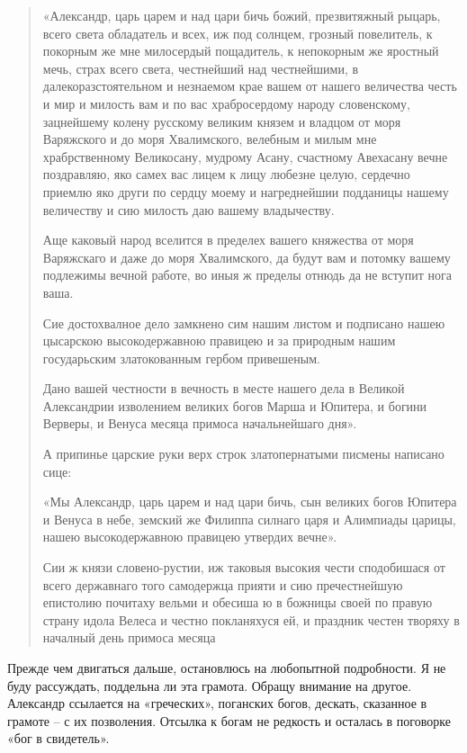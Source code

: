\begin{quotation}
«Александр, царь царем и над цари бичь божий, презвитяжный рыцарь, всего света обладатель и всех, иж под солнцем, грозный повелитель, к покорным же мне милосердый пощадитель, к непокорным же яростный мечь, страх всего света, честнейший над честнейшими, в далекоразстоятельном и незнаемом крае вашем от нашего величества честь и мир и милость вам и по вас храбросердому народу словенскому, зацнейшему колену русскому великим князем и владцом от моря Варяжского и до моря Хвалимского, велебным и милым мне храбрственному Великосану, мудрому Асану, счастному Авехасану вечне поздравляю, яко самех вас лицем к лицу любезне целую, сердечно приемлю яко други по сердцу моему и нагреднейшии подданицы нашему величеству и сию милость даю вашему владычеству. 

Аще каковый народ вселится в пределех вашего княжества от моря Варяжскаго и даже до моря Хвалимского, да будут вам и потомку вашему подлежимы вечной работе, во иныя ж пределы отнюдь да не вступит нога ваша.

Сие достохвалное дело замкнено сим нашим листом и подписано нашею цысарскою высокодержавною правицею и за природным нашим государьским златокованным гербом привешеным.

Дано вашей честности в вечность в месте нашего дела в Великой Александрии изволением великих богов Марша и Юпитера, и богини Верверы, и Венуса месяца примоса начальнейшаго дня». 

А припинье царские руки верх строк златопернатыми писмены написано сице: 

«Мы Александр, царь царем и над цари бичь, сын великих богов Юпитера и Венуса в небе, земский же Филиппа силнаго царя и Алимпиады царицы, нашею высокодержавною правицею утвердих вечне». 

Сии ж князи словено-рустии, иж таковыя высокия чести сподобишася от всего державнаго того самодержца прияти и сию пречестнейшую епистолию почитаху вельми и обесиша ю в божницы своей по правую страну идола Велеса и честно покланяхуся ей, и праздник честен творяху в началный день примоса месяца
\end{quotation}

Прежде чем двигаться дальше, остановлюсь на любопытной подробности. Я не буду рассуждать, поддельна ли эта грамота. Обращу внимание на другое. Александр ссылается на «греческих», поганских богов, дескать, сказанное в грамоте – с их позволения. Отсылка к богам не редкость и осталась в поговорке «бог в свидетель».

